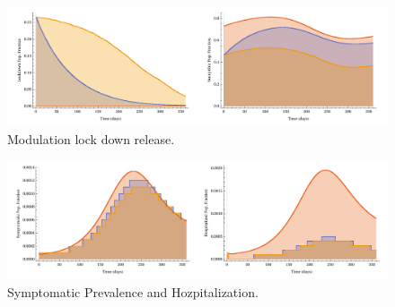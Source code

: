 \begin{figure}[tbh]
    \centering
    \includegraphics[width=1.0\linewidth]{figs/LockdownEffect}
    \caption{Modulation lock down release.}
    \label{fig:lockdowneffect}
\end{figure}

\begin{figure}[tbh]
    \centering
    \includegraphics[width=1.0\linewidth]{figs/VaccinationEffect}
    \caption{Symptomatic Prevalence and Hozpitalization.}
    \label{fig:vaccinationeffect}
\end{figure}
